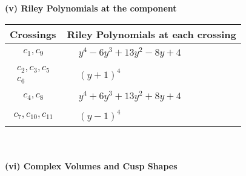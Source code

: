 \documentclass[1p]{elsarticle_modified}
\theoremstyle{definition}
\begin{document}
\newpage\renewcommand{\arraystretch}{1}
\flushleft \textbf{(v) Riley Polynomials at the component}\newline \\
\begin{tabular}{m{50pt}|m{274pt}}
Crossings & \hspace{64pt}Riley Polynomials at each crossing \\
\hline $$\begin{aligned}c_{1},c_{9}\end{aligned}$$&$\begin{aligned}
&y^4-6 y^3+13 y^2-8 y+4
\end{aligned}$\\
\hline $$\begin{aligned}c_{2},c_{3},c_{5}\\c_{6}\end{aligned}$$&$\begin{aligned}
&(y+1)^4
\end{aligned}$\\
\hline $$\begin{aligned}c_{4},c_{8}\end{aligned}$$&$\begin{aligned}
&y^4+6 y^3+13 y^2+8 y+4
\end{aligned}$\\
\hline $$\begin{aligned}c_{7},c_{10},c_{11}\end{aligned}$$&$\begin{aligned}
&(y-1)^4
\end{aligned}$\\
\hline
\end{tabular}\\~\\
\newpage\flushleft \textbf{(vi) Complex Volumes and Cusp Shapes}
\end{document}
